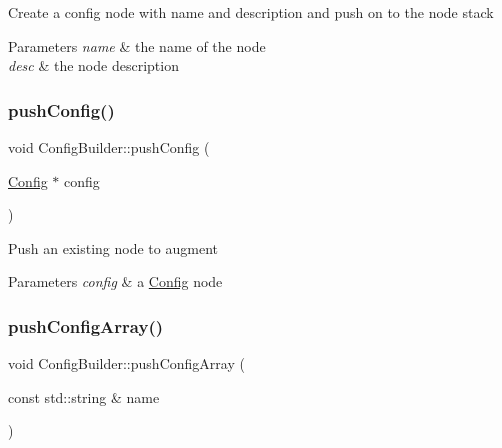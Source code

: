 Create a config node with name and description and push on to the node stack 
\begin{DoxyParams}{Parameters}
{\em name} & the name of the node \\
\hline
{\em desc} & the node description \\
\hline
\end{DoxyParams}
\mbox{\label{classtheoria_1_1config_1_1ConfigBuilder_a2dc70e43627e67521bf921152ee3c131}} 
\subsubsection{\texorpdfstring{push\+Config()}{pushConfig()}\hspace{0.1cm}{\footnotesize\ttfamily [2/2]}}
{\footnotesize\ttfamily void Config\+Builder\+::push\+Config (\begin{DoxyParamCaption}\item[{\hyperlink{classtheoria_1_1config_1_1Config}{Config} $\ast$}]{config }\end{DoxyParamCaption})}

Push an existing node to augment 
\begin{DoxyParams}{Parameters}
{\em config} & a \hyperlink{classtheoria_1_1config_1_1Config}{Config} node \\
\hline
\end{DoxyParams}
\mbox{\label{classtheoria_1_1config_1_1ConfigBuilder_a38baf2a30a0be4a5e99969c07223bc9b}} 
\subsubsection{\texorpdfstring{push\+Config\+Array()}{pushConfigArray()}}
{\footnotesize\ttfamily void Config\+Builder\+::push\+Config\+Array (\begin{DoxyParamCaption}\item[{const std\+::string \&}]{name }\end{DoxyParamCaption})}


